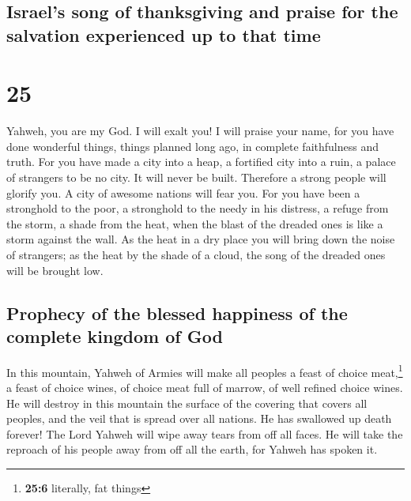 \hypertarget{israels-song-of-thanksgiving-and-praise-for-the-salvation-experienced-up-to-that-time}{%
\subsection{Israel's song of thanksgiving and praise for the salvation
experienced up to that
time}\label{israels-song-of-thanksgiving-and-praise-for-the-salvation-experienced-up-to-that-time}}

\hypertarget{section-24}{%
\section{25}\label{section-24}}

 Yahweh, you are my God. I will exalt you! I will praise
your name, for you have done wonderful things, things planned long ago,
in complete faithfulness and truth.  For you have made a
city into a heap, a fortified city into a ruin, a palace of strangers to
be no city. It will never be built.  Therefore a strong
people will glorify you. A city of awesome nations will fear you.
 For you have been a stronghold to the poor, a stronghold
to the needy in his distress, a refuge from the storm, a shade from the
heat, when the blast of the dreaded ones is like a storm against the
wall.  As the heat in a dry place you will bring down the
noise of strangers; as the heat by the shade of a cloud, the song of the
dreaded ones will be brought low.

\hypertarget{prophecy-of-the-blessed-happiness-of-the-complete-kingdom-of-god}{%
\subsection{Prophecy of the blessed happiness of the complete kingdom of
God}\label{prophecy-of-the-blessed-happiness-of-the-complete-kingdom-of-god}}

 In this mountain, Yahweh of Armies will make all peoples
a feast of choice meat,\footnote{\textbf{25:6} literally, fat things} a
feast of choice wines, of choice meat full of marrow, of well refined
choice wines.  He will destroy in this mountain the
surface of the covering that covers all peoples, and the veil that is
spread over all nations.  He has swallowed up death
forever! The Lord Yahweh will wipe away tears from off all faces. He
will take the reproach of his people away from off all the earth, for
Yahweh has spoken it.

